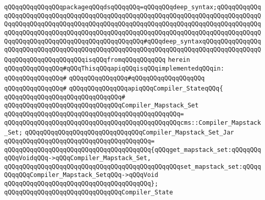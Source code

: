 \verb|qQQqqQQqqQQqqQQqpackageqQQqdsqQQqqQQq=qQQqqQQqdeep_syntax;qQQqqQQqqQQqqQQqqQQqqQQqqQQqqQQqqQQqqQQqqQQqqQQqqQQqqQQqqQQqqQQqqQQqqQQqqQQqqQQqqQQqqQQqqQQqqQQqqQQqqQQqqQQqqQQqqQQqqQQqqQQqqQQqqQQqqQQqqQQqqQQqqQQqqQQqqQQqqQQqqQQqqQQqqQQqqQQqqQQqqQQqqQQqqQQqqQQqqQQqqQQqqQQqqQQqqQQqqQQqqQQqqQQqqQQqqQQqqQQqqQQqqQQqqQQqqQQqqQQq#qQQqdeep_syntaxqQQqqQQqqQQqqQQqqQQqqQQqqQQqqQQqqQQqqQQqqQQqqQQqqQQqqQQqqQQqqQQqqQQqqQQqqQQqqQQqqQQqqQQqqQQqqQQqqQQqqQQqqQQqisqQQqfromqQQqqQQqqQQq|\newline
\verb|herein|\newline
\newline
\verb|qQQqqQQqqQQqqQQq#qQQqThisqQQqapiqQQqisqQQqimplementedqQQqin:|\newline
\verb|qQQqqQQqqQQqqQQq#|\newline
\verb|qQQqqQQqqQQqqQQq#qQQqqQQqqQQqqQQqqQQq|\newline
\verb|qQQqqQQqqQQqqQQq#|\newline
\verb|qQQqqQQqqQQqqQQqapiqQQqCompiler_StateqQQq{|\newline
\verb|qQQqqQQqqQQqqQQqqQQqqQQqqQQqqQQq#|\newline
\verb|qQQqqQQqqQQqqQQqqQQqqQQqqQQqqQQqCompiler_Mapstack_Set|\newline
\verb|qQQqqQQqqQQqqQQqqQQqqQQqqQQqqQQqqQQqqQQqqQQqqQQq=|\newline
\verb|qQQqqQQqqQQqqQQqqQQqqQQqqQQqqQQqqQQqqQQqqQQqqQQqcms::Compiler_Mapstack_Set;|\newline
\newline
\verb|qQQqqQQqqQQqqQQqqQQqqQQqqQQqqQQqCompiler_Mapstack_Set_Jar|\newline
\verb|qQQqqQQqqQQqqQQqqQQqqQQqqQQqqQQqqQQqqQQq=|\newline
\verb|qQQqqQQqqQQqqQQqqQQqqQQqqQQqqQQqqQQqqQQq{qQQqget_mapstack_set:qQQqqQQqqQQqVoidqQQq->qQQqCompiler_Mapstack_Set,|\newline
\verb|qQQqqQQqqQQqqQQqqQQqqQQqqQQqqQQqqQQqqQQqqQQqqQQqset_mapstack_set:qQQqqQQqqQQqCompiler_Mapstack_SetqQQq->qQQqVoid|\newline
\verb|qQQqqQQqqQQqqQQqqQQqqQQqqQQqqQQqqQQqqQQq};|\newline
\newline
\verb|qQQqqQQqqQQqqQQqqQQqqQQqqQQqqQQqCompiler_State|\newline
